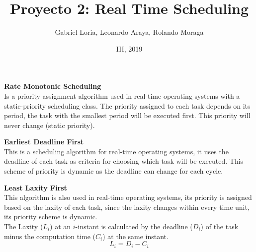 \documentclass{beamer}
\author{Gabriel Loria, Leonardo Araya, Rolando Moraga}
\institute{ITCR, Maestría en Ingeniería en electr\'onica \\ Dise\~no de Sistemas en Tiempo Real}
\date{III, 2019}
\title{Proyecto 2: Real Time Scheduling}
\begin{document}
\begin{frame}
\titlepage
\end{frame}
\begin{frame}
\textbf{Rate Monotonic Scheduling} \\ Is a priority assignment algorithm used in real-time operating systems with a static-priority scheduling class. The priority assigned to each task depends on its period, the task with the smallest period will be executed first. This priority will never change (static priority).
\end{frame}

\begin{frame}
\textbf{Earliest Deadline First} \\ This is a scheduling algorithm for real-time operating systems, it uses the deadline of each task as criteria for choosing which task will be executed. This scheme of priority is dynamic as the deadline can change for each cycle.
\end{frame}

\begin{frame}
\textbf{Least Laxity First} \\ This algorithm is also used in real-time operating systems, its priority is assigned based on the laxity of each task, since the laxity changes within every time unit, its priority scheme is dynamic. \\ The Laxity ($L_i$) at an $i$-instant is calculated by the deadline ($D_i$) of the task minus the computation time ($C_i$) at the same instant. \[L_i = D_i - C_i\]
\end{frame}
\end{document}
